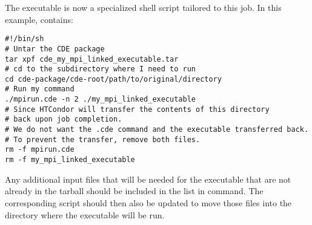 The executable is now a specialized shell script tailored to this job.
In this example,  contains:

\footnotesize
\begin{verbatim}
#!/bin/sh
# Untar the CDE package
tar xpf cde_my_mpi_linked_executable.tar
# cd to the subdirectory where I need to run
cd cde-package/cde-root/path/to/original/directory
# Run my command
./mpirun.cde -n 2 ./my_mpi_linked_executable
# Since HTCondor will transfer the contents of this directory
# back upon job completion.
# We do not want the .cde command and the executable transferred back.
# To prevent the transfer, remove both files.
rm -f mpirun.cde
rm -f my_mpi_linked_executable
\end{verbatim}
\normalsize

Any additional input files that will be needed for the executable
that are not already in the tarball
should be included in the list in  command. 
The corresponding script should then also be updated to move those files into
the directory where the executable will be run.


